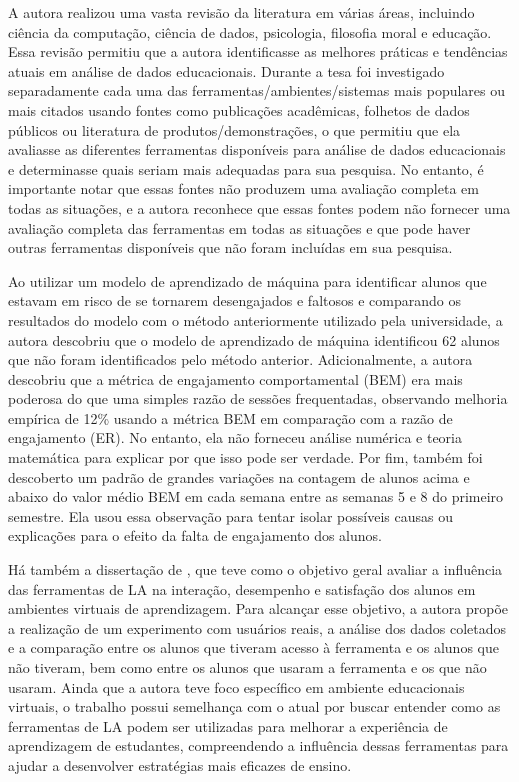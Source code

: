 A autora realizou uma vasta revisão da literatura em várias áreas, incluindo ciência da computação, ciência de dados, psicologia, filosofia moral e educação. Essa revisão permitiu que a autora identificasse as melhores práticas e tendências atuais em análise de dados educacionais. Durante a tesa foi investigado separadamente cada uma das ferramentas/ambientes/sistemas mais populares ou mais citados usando fontes como publicações acadêmicas, folhetos de dados públicos ou literatura de produtos/demonstrações, o que permitiu que ela avaliasse as diferentes ferramentas disponíveis para análise de dados educacionais e determinasse quais seriam mais adequadas para sua pesquisa. No entanto, é importante notar que essas fontes não produzem uma avaliação completa em todas as situações, e a autora reconhece que essas fontes podem não fornecer uma avaliação completa das ferramentas em todas as situações e que pode haver outras ferramentas disponíveis que não foram incluídas em sua pesquisa.

Ao utilizar um modelo de aprendizado de máquina para identificar alunos que estavam em risco de se tornarem desengajados e faltosos e comparando os resultados do modelo com o método anteriormente utilizado pela universidade, a autora descobriu que o modelo de aprendizado de máquina identificou 62 alunos que não foram identificados pelo método anterior. Adicionalmente, a autora descobriu que a métrica de engajamento comportamental (BEM) era mais poderosa do que uma simples razão de sessões frequentadas, observando melhoria empírica de 12\% usando a métrica BEM em comparação com a razão de engajamento (ER). No entanto, ela não forneceu análise numérica e teoria matemática para explicar por que isso pode ser verdade. Por fim, também foi descoberto um padrão de grandes variações na contagem de alunos acima e abaixo do valor médio BEM em cada semana entre as semanas 5 e 8 do primeiro semestre. Ela usou essa observação para tentar isolar possíveis causas ou explicações para o efeito da falta de engajamento dos alunos.


Há também a dissertação de , que teve como o objetivo geral avaliar a influência das ferramentas de LA na interação, desempenho e satisfação dos alunos em ambientes virtuais de aprendizagem. Para alcançar esse objetivo, a autora propõe a realização de um experimento com usuários reais, a análise dos dados coletados e a comparação entre os alunos que tiveram acesso à ferramenta e os alunos que não tiveram, bem como entre os alunos que usaram a ferramenta e os que não usaram. Ainda que a autora teve foco específico em ambiente educacionais virtuais, o trabalho possui semelhança com o atual por buscar entender como as ferramentas de LA podem ser utilizadas para melhorar a experiência de aprendizagem de estudantes, compreendendo a influência dessas ferramentas para ajudar a desenvolver estratégias mais eficazes de ensino.

